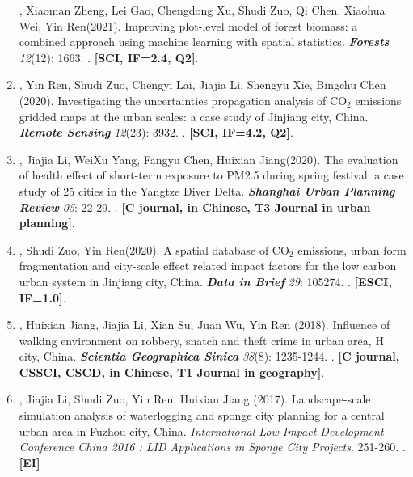 \begin{enumerate}
    \Shaoqing\CF, Xiaoman Zheng\CF, Lei Gao, Chengdong Xu, Shudi Zuo, Qi Chen, Xiaohua Wei, Yin Ren\CS (2021).
    Improving plot-level model of forest biomass: a combined approach using machine learning with spatial statistics.
    \textbf{\textit{Forests}} \textit{12}(12): 1663.
    . \textbf{[SCI, IF=2.4, Q2]}.
\item
    \Shaoqing\CF, Yin Ren\CF, Shudi Zuo\CS, Chengyi Lai, Jiajia Li, Shengyu Xie, Bingchu Chen (2020).
    Investigating the uncertainties propagation analysis of CO$_2$ emissions gridded maps at the urban scales: a case study of Jinjiang city, China. 
    \textbf{\textit{Remote Sensing}} \textit{12}(23): 3932.
    . \textbf{[SCI, IF=4.2, Q2]}.
\item
    \Shaoqing, Jiajia Li, WeiXu Yang, Fangyu Chen, Huixian Jiang\CS (2020).
    The evaluation of health effect of short-term exposure to PM2.5 during spring festival: a case study of 25 cities in the Yangtze Diver Delta.
    \textbf{\textit{Shanghai Urban Planning Review}} \textit{05}: 22-29.
    . \textbf{[C journal, in Chinese, T3 Journal in urban planning]}.
\item
    \Shaoqing, Shudi Zuo, Yin Ren\CS (2020).
    A spatial database of CO$_2$ emissions, urban form fragmentation and city-scale effect related impact factors for the low carbon urban system in Jinjiang city, China.
    \textbf{\textit{Data in Brief}} \textit{29}: 105274.
    . \textbf{[ESCI, IF=1.0]}.
\item
    \Shaoqing, Huixian Jiang\CS, Jiajia Li, Xian Su, Juan Wu, Yin Ren (2018).
	Influence of walking environment on robbery, snatch and theft crime in urban area, H city, China.
    \textbf{\textit{Scientia Geographica Sinica}}  \textit{38}(8): 1235-1244.
    . \textbf{[C journal, CSSCI, CSCD, in Chinese, T1 Journal in geography]}.
\item
    \Shaoqing, Jiajia Li, Shudi Zuo, Yin Ren, Huixian Jiang (2017).
	Landscape-scale simulation analysis of waterlogging and sponge city planning for a central urban area in Fuzhou city, China.
    \textit{International Low Impact Development Conference China 2016 : LID Applications in Sponge City Projects}. 251-260.
    . \textbf{[EI]}
\end{enumerate}

